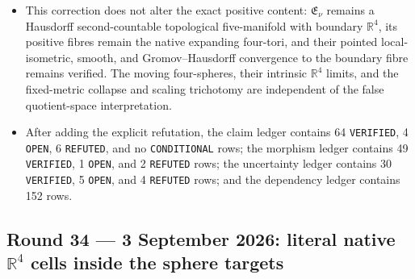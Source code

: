 \begin{itemize}[leftmargin=1.8em]
\item This correction does not alter the exact positive content:
\(\mathfrak E_\nu\) remains a Hausdorff second-countable topological
five-manifold with boundary \(\mathbb R^4\), its positive fibres remain the
native expanding four-tori, and their pointed local-isometric, smooth, and
Gromov--Hausdorff convergence to the boundary fibre remains verified.  The
moving four-spheres, their intrinsic \(\mathbb R^4\) limits, and the
fixed-metric collapse and scaling trichotomy are independent of the false
quotient-space interpretation.

\item After adding the explicit refutation, the claim ledger contains 64
\texttt{VERIFIED}, 4 \texttt{OPEN}, 6 \texttt{REFUTED}, and no
\texttt{CONDITIONAL} rows; the morphism ledger contains 49
\texttt{VERIFIED}, 1 \texttt{OPEN}, and 2 \texttt{REFUTED} rows; the
uncertainty ledger contains 30 \texttt{VERIFIED}, 5 \texttt{OPEN}, and 4
\texttt{REFUTED} rows; and the dependency ledger contains 152 rows.
\end{itemize}

\subsection*{Round 34 --- 3 September 2026: literal native
\(\mathbb R^4\) cells inside the sphere targets}

